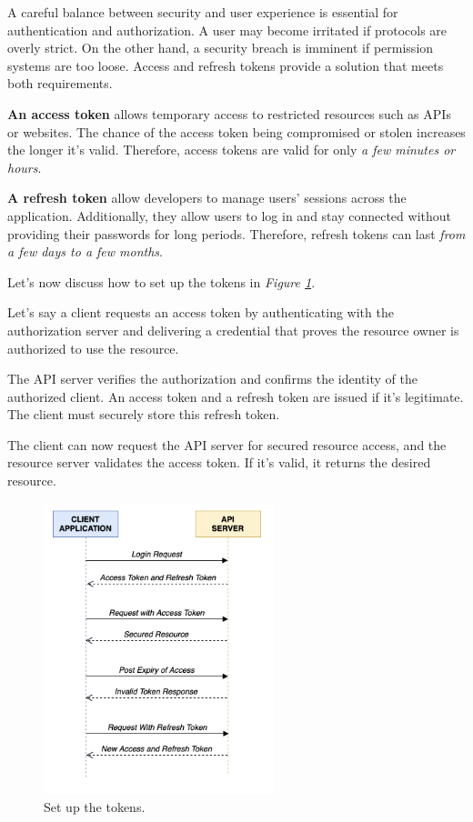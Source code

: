 A careful balance between security and user experience is essential for authentication and authorization. A user may become irritated if protocols are overly strict. On the other hand, a security breach is imminent if permission systems are too loose. Access and refresh tokens provide a solution that meets both requirements.

\textbf{An access token} allows temporary access to restricted resources such as APIs or websites. The chance of the access token being compromised or stolen increases the longer it’s valid. Therefore, access tokens are valid for only \textit{a few minutes or hours}.

\textbf{A refresh token} allow developers to manage users’ sessions across the application. Additionally, they allow users to log in and stay connected without providing their passwords for long periods. Therefore, refresh tokens can last \textit{from a few days to a few months}.

Let’s now discuss how to set up the tokens in \textit{Figure \ref{fig:tokens-flow}}.

Let’s say a client requests an access token by authenticating with the authorization server and delivering a credential that proves the resource owner is authorized to use the resource.

The API server verifies the authorization and confirms the identity of the authorized client. An access token and a refresh token are issued if it’s legitimate. The client must securely store this refresh token.

The client can now request the API server for secured resource access, and the resource server validates the access token. If it’s valid, it returns the desired resource.

\begin{figure}[H]
    \centering
    \includegraphics[width=0.6\textwidth]{Figures/Implementation/Tokens.png}
    \caption{Set up the tokens.}
    \label{fig:tokens-flow}
\end{figure}

